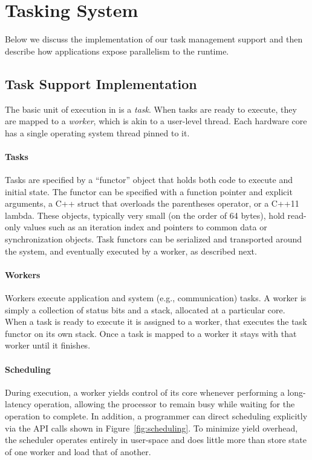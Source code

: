 \section{Tasking System}

Below we discuss the implementation of our task management support and then
describe how applications expose parallelism to the \Grappa runtime.

\subsection{Task Support Implementation}

The basic unit of execution in \Grappa is a {\em task}. When tasks are ready to
execute, they are mapped to a {\em worker}, which is akin to a user-level
thread. Each hardware core has a single operating system thread pinned to it.

\paragraph{Tasks} 
Tasks are specified by a ``functor'' object that holds both code to execute and initial state. The functor can be specified with a function pointer and explicit arguments, a C++ struct that overloads the parentheses operator, or a C++11 lambda. These objects, typically very small (on the order of 64 bytes), hold read-only values such as an iteration index and pointers to common data or synchronization objects. Task functors can be serialized and transported around the system, and eventually executed by a worker, as described next.

\paragraph{Workers} Workers execute application and system (e.g.,
communication) tasks. A worker is simply a collection of status bits and a
stack, allocated at a particular core. When a task is ready to execute it
is assigned to a worker, that executes the task functor on its own stack. 
Once a task is mapped to a worker it stays with that worker until it finishes.

\paragraph{Scheduling} During execution, a worker yields control of its core
whenever performing a long-latency operation, allowing the processor to
remain busy while waiting for the operation to complete. In addition, a
programmer can direct scheduling explicitly via the \Grappa API calls shown in
Figure~\ref{fig:scheduling}. To minimize yield overhead, the \Grappa scheduler
operates entirely in user-space and does little more than store state of one
worker and load that of another.

